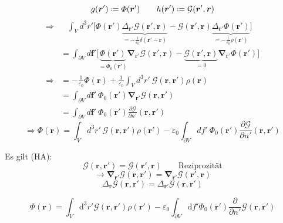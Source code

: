 \documentclass[titlepage,11pt,a4paper,ngerman]{report}
\newcommand*{\defeq}{\mathrel{\vcenter{\baselineskip0.5ex \lineskiplimit0pt \hbox{\scriptsize.}\hbox{\scriptsize.}}}=}
\newcommand{\tx}[1]{\textrm{#1}}
\newcommand{\ub}[1]{\underbrace{#1}}
\newcommand{\dd}{\tx{d}}
\newcommand{\gre}{\mathcal{G}}
\newcommand{\prt}[2]{\frac{\partial #1}{\partial #2}}
\newcommand{\pofr}{\Phi(\vec{r})}
\renewcommand{\Phi}{\varPhi}
\newcommand{\grr}{\mathcal G(\vec{r},\vec{r}')}
\renewcommand{\vec}[1]{\boldsymbol{#1}}
\renewcommand{\epsilon}{\varepsilon}
\newcommand{\vabla}{\boldsymbol{\nabla}}
\newcommand{\frbox}[2]{\begin{tcolorbox}[colback=white,colframe=red!75!black,fonttitle=\bfseries,title=#1]#2\end{tcolorbox}}
\begin{document}
\begin{equation*}
g(\vec{r}') \defeq \Phi(\vec{r}') \qquad h(\vec{r}') \defeq \gre(\vec{r}',\vec{r})
\end{equation*}
\begin{align*}
\Rightarrow & \ \ \ \, \int_V d^3 r' \Bigg[ \Phi(\vec{r}') \ub{\Delta_{\vec{r}'} \gre(\vec{r}',\vec{r})}_{= -\frac{1}{\epsilon_0} \delta(\vec{r}' - \vec{r})} - \gre(\vec{r}',\vec{r}) \ub{\Delta_{\vec{r}'} \Phi(\vec{r}')}_{= - \frac{1}{\epsilon_0} \rho(\vec{r}')} \Bigg]\\
&= \int_{\partial V} d\vec{f}' \Bigg[ \ub{\Phi(\vec{r}')}_{= \Phi_0(\vec{r}')} \vec{\nabla}_{\vec{r}'} \gre(\vec{r}',\vec{r}) - \ub{\gre(\vec{r}',\vec{r})}_{= 0} \vec{\nabla}_{\vec{r}'} \Phi(\vec{r}') \Bigg]\\
\Rightarrow &= - \frac{1}{\epsilon_0} \pofr + \frac{1}{\epsilon_0} \int_V d^3 r'\ \mathcal G(\vec{r}, \vec{r}') \rho(\vec{r})\\
&= \int_{\partial V} d \vec{f}'\ \Phi_0 (\vec{r}') \vabla_{\vec{r}'} \mathcal G(\vec{r}, \vec{r}')\\
&= \int_{\partial V} d \vec{f}'\ \Phi_0 (\vec{r}') \prt{\mathcal G}{n'}(\vec{r}, \vec{r}')
\end{align*}
\begin{equation*}
\Rightarrow \pofr = \int_V d^3r'\ \mathcal G(\vec{r}, \vec{r}') \rho(\vec{r}') - \epsilon_0 \int_{\partial V} df'\ \Phi_0 (\vec{r}') \prt{\mathcal G}{n'}(\vec{r}, \vec{r}')
\end{equation*}

Es gilt (HA):
\begin{equation*}
\gre(\vec{r},\vec{r}') = \gre(\vec{r}',\vec{r}) \qquad \tx{Reziprozität}
\end{equation*}
\begin{equation*}
\rightarrow \vec{\nabla}_{\vec{r}'} \gre(\vec{r},\vec{r}') = \vec{\nabla}_{\vec{r}'} \gre(\vec{r}',\vec{r})
\end{equation*}
\begin{equation*}
\Delta_{\vec{r}} \gre(\vec{r},\vec{r}') = \Delta_{\vec{r}'} \gre(\vec{r},\vec{r}')
\end{equation*}

\frbox{Potential bei Randwertproblem}{
\begin{equation}
\pofr = \int_{V} \dd^3 r' \grr \rho(\vec{r}') - \epsilon_0 \int_{\partial V} \dd f' \Phi_0(\vec{r}') \prt{}{n'} \grr \tag{1}
\label{pot}
\end{equation}}


\end{document}
